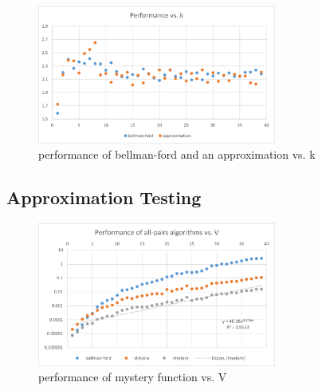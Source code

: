 \documentclass[12pt]{article}
\begin{document}
\begin{figure}[H]
\centering
\includegraphics[width=0.7\textwidth,height=\textheight,keepaspectratio]{bellman_ford_time.png}
\caption{performance of bellman-ford and an approximation vs. k}
\label{Figure: m1}
\end{figure}

\subsection{Approximation Testing}

\begin{figure}[H]
\centering
\includegraphics[width=0.7\textwidth,height=\textheight,keepaspectratio]{mystery.png}
\caption{performance of mystery function vs. V}
\label{Figure: m3}
\end{figure}
\end{document}
